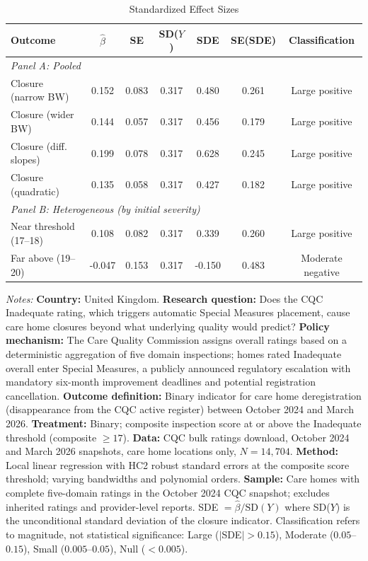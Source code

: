 \begin{table}[t]
\centering
\begin{threeparttable}
\caption{Standardized Effect Sizes}
\label{tab:sde}
\begin{tabular}{lcccccc}
\toprule
Outcome & $\hat{\beta}$ & SE & SD($Y$) & SDE & SE(SDE) & Classification \\
\midrule
\multicolumn{7}{l}{\textit{Panel A: Pooled}} \\
\midrule
Closure (narrow BW) & 0.152 & 0.083 & 0.317 & 0.480 & 0.261 & Large positive \\
Closure (wider BW) & 0.144 & 0.057 & 0.317 & 0.456 & 0.179 & Large positive \\
Closure (diff. slopes) & 0.199 & 0.078 & 0.317 & 0.628 & 0.245 & Large positive \\
Closure (quadratic) & 0.135 & 0.058 & 0.317 & 0.427 & 0.182 & Large positive \\
\midrule
\multicolumn{7}{l}{\textit{Panel B: Heterogeneous (by initial severity)}} \\
\midrule
Near threshold (17--18) & 0.108 & 0.082 & 0.317 & 0.339 & 0.260 & Large positive \\
Far above (19--20) & -0.047 & 0.153 & 0.317 & -0.150 & 0.483 & Moderate negative \\
\bottomrule
\end{tabular}
\begin{tablenotes}[flushleft]
\small
\item \textit{Notes:} \textbf{Country:} United Kingdom. \textbf{Research question:} Does the CQC Inadequate rating, which triggers automatic Special Measures placement, cause care home closures beyond what underlying quality would predict? \textbf{Policy mechanism:} The Care Quality Commission assigns overall ratings based on a deterministic aggregation of five domain inspections; homes rated Inadequate overall enter Special Measures, a publicly announced regulatory escalation with mandatory six-month improvement deadlines and potential registration cancellation. \textbf{Outcome definition:} Binary indicator for care home deregistration (disappearance from the CQC active register) between October 2024 and March 2026. \textbf{Treatment:} Binary; composite inspection score at or above the Inadequate threshold (composite $\geq 17$). \textbf{Data:} CQC bulk ratings download, October 2024 and March 2026 snapshots, care home locations only, $N = 14{,}704$. \textbf{Method:} Local linear regression with HC2 robust standard errors at the composite score threshold; varying bandwidths and polynomial orders. \textbf{Sample:} Care homes with complete five-domain ratings in the October 2024 CQC snapshot; excludes inherited ratings and provider-level reports. SDE $= \hat{\beta} / \text{SD}(Y)$ where SD($Y$) is the unconditional standard deviation of the closure indicator. Classification refers to magnitude, not statistical significance: Large ($|$SDE$| > 0.15$), Moderate ($0.05$--$0.15$), Small ($0.005$--$0.05$), Null ($< 0.005$).
\end{tablenotes}
\end{threeparttable}
\end{table}
